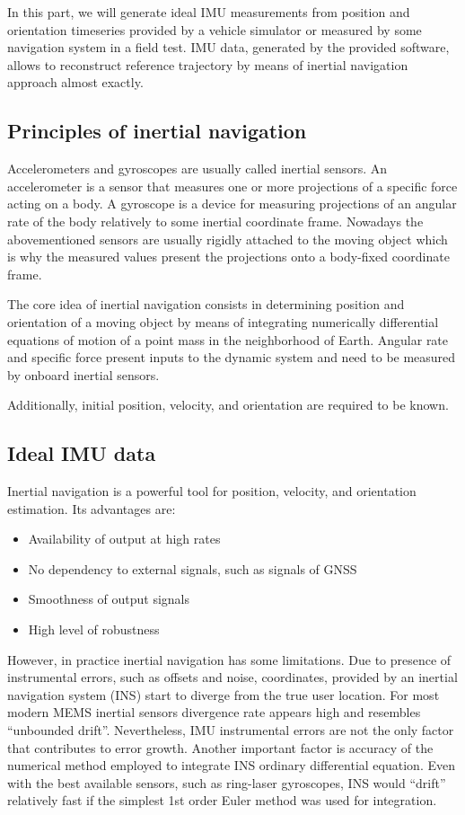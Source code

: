 \documentclass[conference]{IEEEtran}
\begin{document}
In this part, we will generate ideal IMU measurements from position and orientation timeseries provided by a vehicle simulator or measured by some navigation system in a field test. IMU data, generated by the provided software, allows to reconstruct reference trajectory by means of inertial navigation approach almost exactly.

\subsection{Principles of inertial navigation}

Accelerometers and gyroscopes are usually called inertial sensors. An accelerometer is a sensor that measures one or more projections of a specific force acting on a body. A gyroscope is a device for measuring projections of an angular rate of the body relatively to some inertial coordinate frame. Nowadays the abovementioned sensors are usually rigidly attached to the moving object which is why the measured values present the projections onto a body-fixed coordinate frame.

The core idea of inertial navigation consists in determining position and orientation of a moving object by means of integrating numerically differential equations of motion of a point mass in the neighborhood of Earth. Angular rate and specific force present inputs to the dynamic system and need to be measured by onboard inertial sensors. 

Additionally, initial position, velocity, and orientation are required to be known.

\subsection{Ideal IMU data}

Inertial navigation is a powerful tool for position, velocity, and orientation estimation. Its advantages are:

\begin{itemize}
  \item Availability of output at high rates
  \item No dependency to external signals, such as signals of GNSS
  \item Smoothness of output signals
  \item High level of robustness
\end{itemize}

However, in practice inertial navigation has some limitations. Due to presence of instrumental errors, such as offsets and noise, coordinates, provided by an inertial navigation system (INS) start to diverge from the true user location. For most modern MEMS inertial sensors divergence rate appears high and resembles “unbounded drift”. Nevertheless, IMU instrumental errors are not the only factor that contributes to error growth. Another important factor is accuracy of the numerical method employed to integrate INS ordinary differential equation. Even with the best available sensors, such as ring-laser gyroscopes, INS would “drift” relatively fast if the simplest 1st order Euler method was used for integration.
\end{document}
